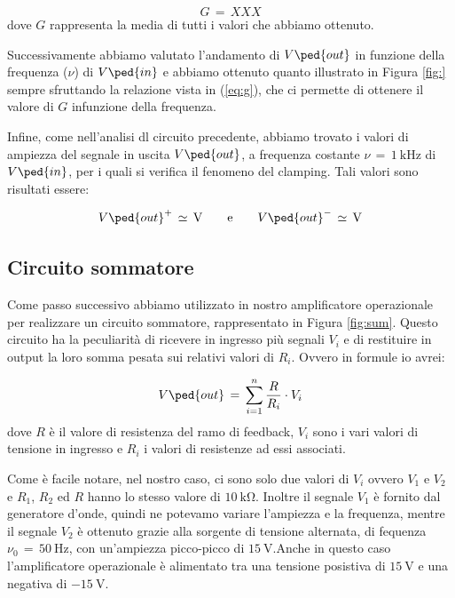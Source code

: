 \begin{equation}
        G\,=\, XXX
\end{equation}
%
dove $G$ rappresenta la media di tutti i valori che abbiamo ottenuto.

Successivamente abbiamo valutato l'andamento di $V\ped{out}$ in funzione della frequenza ($\nu$) di $V\ped{in}$ e abbiamo ottenuto quanto illustrato in Figura \ref{fig:} sempre sfruttando la relazione vista in (\ref{eq:g}), che ci permette di ottenere il valore di $G$ infunzione della frequenza.

Infine, come nell'analisi dl circuito precedente, abbiamo trovato i valori di ampiezza del segnale in uscita $V\ped{out}$, a frequenza costante $\nu\,=\,\SI{1}{\kilo\hertz}$ di $V\ped{in}$, per i quali si verifica il fenomeno del clamping. Tali valori sono risultati essere:

\begin{equation}
        V\ped{out}^+\,\simeq\,\SI{}{\volt} \qquad \text{e} \qquad V\ped{out}^-\,\simeq\,\SI{}{\volt}
\end{equation}

\subsection*{Circuito sommatore}

Come passo successivo abbiamo utilizzato in nostro amplificatore operazionale per realizzare un circuito sommatore, rappresentato in Figura \ref{fig:sum}. Questo circuito ha la peculiarità di ricevere in ingresso più segnali $V_i$ e di restituire in output la loro somma pesata sui relativi valori di $R_i$. Ovvero in formule io avrei:

\begin{equation}
        V\ped{out}\,=\,\sum_{i=1}^{n}{\frac{R}{R_i} \cdot V_i}
\end{equation}
%
dove $R$ è il valore di resistenza del ramo di feedback, $V_i$ sono i vari valori di tensione in ingresso e $R_i$ i valori di resistenze ad essi associati.

Come è facile notare, nel nostro caso, ci sono solo due valori di $V_i$ ovvero $V_1$ e $V_2$ e $R_1$, $R_2$ ed $R$ hanno lo stesso valore di $\SI{10}{\kilo\ohm}$. Inoltre il segnale $V_1$ è fornito dal generatore d'onde, quindi ne potevamo variare l'ampiezza e la frequenza, mentre il segnale $V_2$ è ottenuto grazie alla sorgente di tensione alternata, di fequenza $\nu_0\,=\,\SI{50}{\hertz}$, con un'ampiezza picco-picco di $\SI{15}{\volt}$.Anche in questo caso l'amplificatore operazionale è alimentato tra una tensione posistiva di $\SI{+15}{\volt}$ e una negativa di $\SI{-15}{\volt}$.

